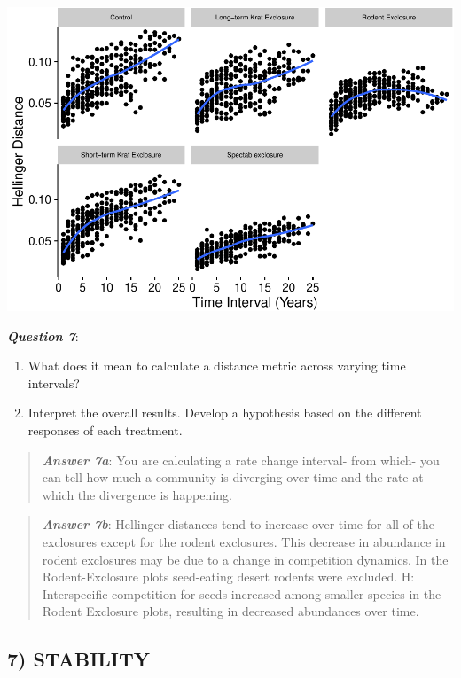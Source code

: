 \documentclass[]{article}
\providecommand{\tightlist}{%
  \setlength{\itemsep}{0pt}\setlength{\parskip}{0pt}}
\begin{document}
\includegraphics{temporal_assignment_files/figure-latex/unnamed-chunk-8-1.pdf}

\textbf{\emph{Question 7}}:

\begin{enumerate}
\def\labelenumi{\alph{enumi}.}
\tightlist
\item
  What does it mean to calculate a distance metric across varying time
  intervals?
\item
  Interpret the overall results. Develop a hypothesis based on the
  different responses of each treatment.
\end{enumerate}

\begin{quote}
\textbf{\emph{Answer 7a}}: You are calculating a rate change interval-
from which- you can tell how much a community is diverging over time and
the rate at which the divergence is happening.
\end{quote}

\begin{quote}
\textbf{\emph{Answer 7b}}: Hellinger distances tend to increase over
time for all of the exclosures except for the rodent exclosures. This
decrease in abundance in rodent exclosures may be due to a change in
competition dynamics. In the Rodent-Exclosure plots seed-eating desert
rodents were excluded. H: Interspecific competition for seeds increased
among smaller species in the Rodent Exclosure plots, resulting in
decreased abundances over time.
\end{quote}

\subsection{7) STABILITY}\label{stability}
\end{document}
